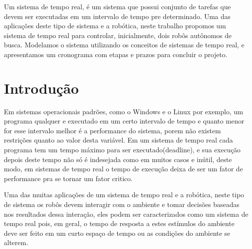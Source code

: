 \documentclass{abnt}
\begin{document}



 

\folhaderosto

\begin{resumo}
    Um sistema de tempo real, é um sistema que possui conjunto de tarefas que
    devem ser executadas em um intervalo de tempo pre determinado. Uma das
    aplicações deste tipo de sistema e a robótica, neste
    trabalho propomos um sistema de tempo real para controlar, inicialmente,
    dois robôs autônomos de busca. Modelamos o sistema utilizando os conceitos
    de sistemas de tempo real, e apresentamos um cronograma com etapas e prazos
    para concluir o projeto.
\end{resumo}

\chapter{Introdução} \label{intro}


    Em sistemas operacionais padrões, como o Windows e o Linux por exemplo, um
    programa qualquer e executado em um certo intervalo de tempo e quanto menor for
    esse intervalo melhor é a performance do sistema, porem não existem restrições
    quanto ao valor desta variável. Em um sistema de tempo real cada programa tem um
    tempo máximo para ser executado(deadline), e sua execução depois deste
    tempo não só é indesejada como em muitos casos e inútil, deste modo, em
    sistemas de tempo real o tempo de execução deixa de ser um fator de
    performance pra se tornar um fator critico.

    Uma das muitas aplicações de um sistema de tempo real e a robótica, neste
    tipo de sistema os robôs devem interagir com o ambiente e tomar decisões
    baseadas nos resultados dessa interação, eles podem ser caracterizados como
    um sistema de tempo real pois, em geral, o tempo de resposta a estes
    estímulos do ambiente deve ser feito em um curto espaço de tempo ou as
    condições do ambiente se alterem.
\end{document}
